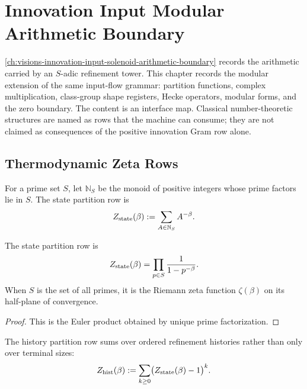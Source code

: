 \chapter{Innovation Input Modular Arithmetic Boundary}
\label{ch:visions-innovation-input-modular-arithmetic-boundary}

\autoref{ch:visions-innovation-input-solenoid-arithmetic-boundary} records
the arithmetic carried by an $S$-adic refinement tower. This chapter
records the modular extension of the same input-flow grammar: partition
functions, complex multiplication, class-group shape registers, Hecke
operators, modular forms, and the zero boundary. The content is an
interface map. Classical number-theoretic structures are named as rows
that the machine can consume; they are not claimed as consequences of the
positive innovation Gram row alone.

\section{Thermodynamic Zeta Rows}
\label{sec:innovation-input-modular-thermodynamic-zeta}

\begin{definition}
\label{def:innovation-input-modular-state-partition-row}
For a prime set $S$, let $\mathbb N_S$ be the monoid of positive integers
whose prime factors lie in $S$. The state partition row is
$$
Z_{\rm state}(\beta)
:=
\sum_{A\in\mathbb N_S}A^{-\beta}.
$$
\end{definition}

\begin{theorem}
\label{thm:innovation-input-modular-state-partial-zeta}
The state partition row is
$$
Z_{\rm state}(\beta)
=
\prod_{p\in S}\frac{1}{1-p^{-\beta}}.
$$
When $S$ is the set of all primes, it is the Riemann zeta function
$\zeta(\beta)$ on its half-plane of convergence.
\end{theorem}

\begin{proof}
This is the Euler product obtained by unique prime factorization.
\end{proof}

\begin{definition}
\label{def:innovation-input-modular-history-partition-row}
The history partition row sums over ordered refinement histories rather
than only over terminal sizes:
$$
Z_{\rm hist}(\beta)
:=
\sum_{k\ge0}\bigl(Z_{\rm state}(\beta)-1\bigr)^k.
$$
\end{definition}

